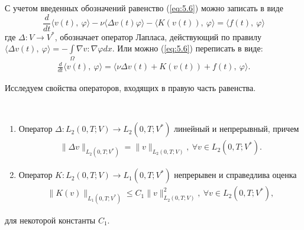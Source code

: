 С учетом введенных обозначений равенство (\ref{eq:5.6}) можно записать в виде
$$\frac{d}{dt} \langle v(t), \ \varphi \rangle - \nu\langle \Delta v(t) \varphi \rangle -
\langle K(v(t)), \ \varphi \rangle = \langle f(t), \ \varphi \rangle $$
где $\Delta: V \rightarrow V^\ast$, обозначает оператор Лапласа, действующий по правилу
$\langle \Delta v(t), \ \varphi \rangle=-\int\limits_\Omega \nabla v:\nabla\varphi dx.$
Или можно (\ref{eq:5.6}) переписать в виде:
\begin{equation}\label{eq:5.8}
    \begin{gathered}
        \frac{d}{dt} \langle v(t), \ \varphi \rangle = \langle \nu\Delta v(t)+K(v(t))+f(t), \ \varphi \rangle.
    \end{gathered}
\end{equation}

Исследуем свойства операторов, входящих в правую часть равенства.
\begin{lemma} ~\\
    \begin{enumerate}
        \item Оператор \linebreak $\Delta: L_2(0, T; V) \rightarrow L_2(0, T; V^\ast)$ линейный и непрерывный, причем
        \begin{equation}\label{eq:5.9}
            \begin{gathered}
                \parallel \Delta v \parallel_{L_2(0, T; V^\ast)} = \parallel v \parallel_{L_2(0, T; V)}, \ \forall v \in L_2(0, T; V^\ast).
            \end{gathered}
        \end{equation}
        \item Оператор $K: L_2(0, T; V) \rightarrow L_1(0, T; V^\ast)$ непрерывен и справедлива оценка
        \begin{equation}\label{eq:5.10}
            \begin{gathered}
                \parallel K(v) \parallel_{L_1(0, T; V^\ast)} \leqslant C_1\parallel v \parallel^2_{L_2(0, T;V)}, \ \forall v \in L_2(0, T; V^\ast),
            \end{gathered}
        \end{equation}
    \end{enumerate}
    для некоторой константы $C_1$.
\end{lemma}

